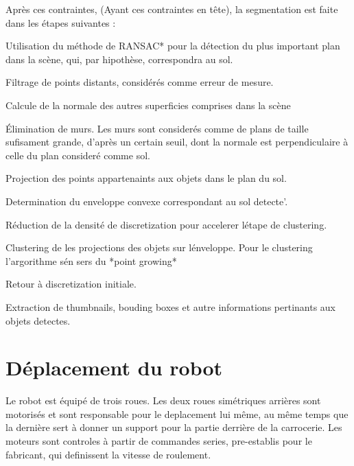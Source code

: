 Après ces contraintes, (Ayant ces contraintes en tête), la segmentation est faite dans les étapes suivantes :
\begin{numerate}
  \item Utilisation du méthode de RANSAC* pour la détection du plus important plan dans la scène, qui, par hipothèse, correspondra au sol.

  \item Filtrage de points distants, considérés comme erreur de mesure.

  \item Calcule de la normale des autres superficies comprises dans la scène

  \item Élimination de murs. Les murs sont considerés comme de plans de 
taille sufisament grande, d'après un certain seuil, dont la normale est perpendiculaire à celle du plan consideré comme sol.

   \item Projection des points appartenaints aux objets dans le plan du sol. 

   \item Determination du enveloppe convexe correspondant au sol detecte'.

   \item Réduction de la densité de discretization pour accelerer létape de clustering.

   \item Clustering de les projections des objets sur lénveloppe. Pour le clustering l'argorithme sén sers du *point growing*

   \item Retour à discretization initiale.

   \item Extraction de thumbnails, bouding boxes et autre informations pertinants aux objets detectes.
\end{numerate}

\section{Déplacement du robot}

Le robot est équipé de trois roues. Les deux roues simétriques arrières sont motorisés et sont responsable pour le deplacement lui même, au même temps que la dernière sert à donner un support pour la partie derrière de la carrocerie. Les moteurs sont controles à partir de commandes series, pre-establis pour le fabricant, qui definissent la vitesse de roulement. 

